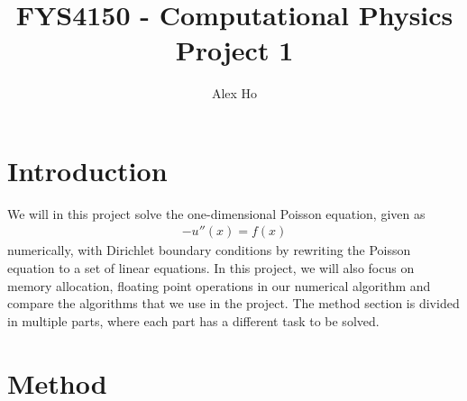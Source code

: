 \documentclass[12pt]{article}
\author{Alex Ho}
\title{FYS4150 - Computational Physics \\ Project 1}
\begin{document}
\maketitle
\section{Introduction}
We will in this project solve the one-dimensional Poisson equation, given as
\begin{align}
-u''(x) = f(x)
\end{align}
numerically, with Dirichlet boundary conditions by rewriting the Poisson equation to a set of linear equations. In this project, we will also focus on memory allocation, floating point operations in our numerical algorithm and compare the algorithms that we use in the project.  The method section is divided in multiple parts, where each part has a different task to be solved.
\section{Method}
\end{document}
